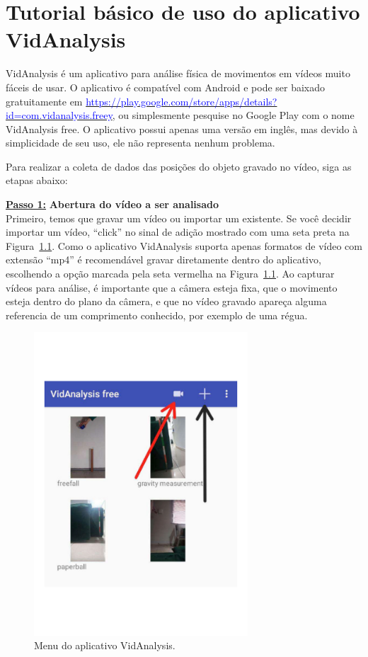 \chapter{Tutorial básico de uso do aplicativo VidAnalysis}
\label{sec:vidanalysis}
\vspace{-0.7cm}

 
VidAnalysis é um aplicativo para análise física de movimentos em vídeos muito fáceis de usar.
O aplicativo é compatível com Android e pode ser baixado gratuitamente em \href{https://play.google.com/store/apps/details?id=com.vidanalysis.free}{\textcolor {blue}
{https://play.google.com/store/apps/details?id=com.vidanalysis.freey}}, ou simplesmente pesquise no Google Play com o nome VidAnalysis free. O aplicativo possui apenas uma versão em inglês, mas devido à simplicidade de seu uso, ele não representa nenhum problema.

Para realizar a coleta de dados das posições do objeto gravado no vídeo, siga as etapas abaixo:

\underline{\bf Passo 1:} {\bf Abertura do vídeo a ser analisado}\\


Primeiro, temos que gravar um vídeo ou importar um existente. Se você decidir importar um vídeo, ``click'' no sinal de adição mostrado com uma seta preta na Figura~\ref{apendice1c}. Como o aplicativo VidAnalysis suporta apenas formatos de vídeo com extensão ``mp4'' é recomendável gravar  diretamente dentro do aplicativo, escolhendo a opção marcada pela seta vermelha na Figura~\ref{apendice1c}.
Ao capturar vídeos para análise, é importante que a câmera esteja fixa, que o movimento esteja dentro do plano da câmera, e que no vídeo gravado apareça alguma referencia de 
um comprimento conhecido, por exemplo de uma régua. 

\begin{figure}[h!]
\centering
\includegraphics[width=8cm]{Figuras_exp3/imagenapendicec1.pdf}
\caption{\label{apendice1c} Menu do aplicativo VidAnalysis.}
\end{figure}

